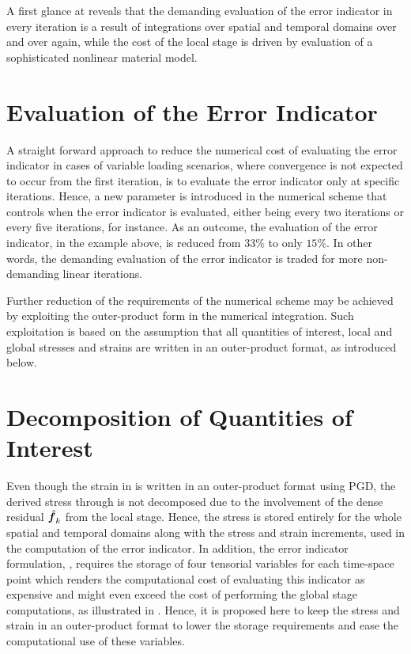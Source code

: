 A first glance at  reveals that the demanding evaluation of the error indicator in every iteration is a result of integrations over spatial and temporal domains over and over again, while the cost of the local stage is driven by evaluation of a sophisticated nonlinear material model.

\section{Evaluation of the Error Indicator}
A straight forward approach to reduce the numerical cost of evaluating the error indicator in cases of variable loading scenarios, where convergence is not expected to occur from the first iteration, is to evaluate the error indicator only at specific iterations. Hence, a new parameter is introduced in the numerical scheme that controls when the error indicator is evaluated, either being every two iterations or every five iterations, for instance. As an outcome, the evaluation of the error indicator, in the example above, is reduced from $33 \percent$ to only $15 \percent$. In other words, the demanding evaluation of the error indicator is traded for more non-demanding linear iterations.

Further reduction of the requirements of the numerical scheme may be achieved by exploiting the outer-product form in the numerical integration. Such exploitation is based on the assumption that all quantities of interest, local and global stresses and strains are written in an outer-product format, as introduced below.

\section{Decomposition of Quantities of Interest}

Even though the strain in  is written in an outer-product format using PGD, the derived stress through  is not decomposed due to the involvement of the dense residual $\mbox{\ensuremath{\hat{\bm f}}}_k$ from the local stage. Hence, the stress is stored entirely for the whole spatial and temporal domains along with the stress and strain increments, used in the computation of the error indicator. In addition, the error indicator formulation, , requires the storage of four tensorial variables for each time-space point which renders the computational cost of evaluating this indicator as expensive and might even exceed the cost of performing the global stage computations, as illustrated in . Hence, it is proposed here to keep the stress and strain in an outer-product format to lower the storage requirements and ease the computational use of these variables.

